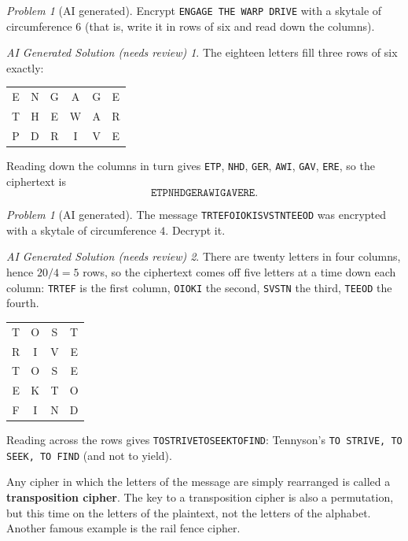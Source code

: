 \documentclass{article}
\theoremstyle{plain}
\theoremstyle{definition}
\theoremstyle{remark}
\newtheorem{problem}[theorem]{Problem}
\newtheorem*{aisolution}{AI Generated Solution (needs review)}
\numberwithin{theorem}{section}
\begin{document}
\begin{problem}[AI generated]
Encrypt \texttt{ENGAGE THE WARP DRIVE} with a skytale of circumference $6$ (that is, write it in rows of six and read down the columns).
\end{problem}
\begin{aisolution}
The eighteen letters fill three rows of six exactly:
\begin{center}
\begin{tabular}{cccccc}
  E & N & G & A & G & E \\
  T & H & E & W & A & R \\
  P & D & R & I & V & E \\
\end{tabular}
\end{center}
Reading down the columns in turn gives \texttt{ETP}, \texttt{NHD}, \texttt{GER}, \texttt{AWI}, \texttt{GAV}, \texttt{ERE}, so the ciphertext is
\[
	\texttt{ETPNHDGERAWIGAVERE}.
\]
\end{aisolution}

\begin{problem}[AI generated]
The message \texttt{TRTEFOIOKISVSTNTEEOD} was encrypted with a skytale of circumference $4$.  Decrypt it.
\end{problem}
\begin{aisolution}
There are twenty letters in four columns, hence $20/4 = 5$ rows, so the ciphertext comes off five letters at a time down each column:  \texttt{TRTEF} is the first column, \texttt{OIOKI} the second, \texttt{SVSTN} the third, \texttt{TEEOD} the fourth.
\begin{center}
\begin{tabular}{cccc}
  T & O & S & T \\
  R & I & V & E \\
  T & O & S & E \\
  E & K & T & O \\
  F & I & N & D \\
\end{tabular}
\end{center}
Reading across the rows gives \texttt{TOSTRIVETOSEEKTOFIND}:  Tennyson's \texttt{TO STRIVE, TO SEEK, TO FIND} (and not to yield).
\end{aisolution}


Any cipher in which the letters of the message are simply rearranged is called a \textbf{transposition cipher}.  The key to a transposition cipher is also a permutation, but this time on the letters of the plaintext, not the letters of the alphabet.  Another famous example is the rail fence cipher.
\end{document}
